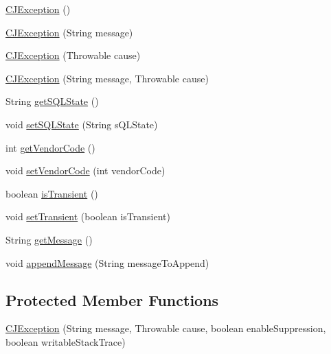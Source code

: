 \begin{DoxyCompactItemize}
\item 
\mbox{\hyperlink{classcom_1_1mysql_1_1cj_1_1exceptions_1_1_c_j_exception_a04cff2e34c2f2ab8915c61a4b58ff2e8}{C\+J\+Exception}} ()
\item 
\mbox{\hyperlink{classcom_1_1mysql_1_1cj_1_1exceptions_1_1_c_j_exception_a126f9d19402c4a2db6e71882f204e933}{C\+J\+Exception}} (String message)
\item 
\mbox{\hyperlink{classcom_1_1mysql_1_1cj_1_1exceptions_1_1_c_j_exception_a755ad709aba5c2a7513ebbfce5da7139}{C\+J\+Exception}} (Throwable cause)
\item 
\mbox{\hyperlink{classcom_1_1mysql_1_1cj_1_1exceptions_1_1_c_j_exception_a976cd10f784169265bdb0828e49c080c}{C\+J\+Exception}} (String message, Throwable cause)
\item 
String \mbox{\hyperlink{classcom_1_1mysql_1_1cj_1_1exceptions_1_1_c_j_exception_a72658f4b1d247e7ff34394c8062de25b}{get\+S\+Q\+L\+State}} ()
\item 
void \mbox{\hyperlink{classcom_1_1mysql_1_1cj_1_1exceptions_1_1_c_j_exception_ae88c79eacca8242bb6901936ecd7466c}{set\+S\+Q\+L\+State}} (String s\+Q\+L\+State)
\item 
int \mbox{\hyperlink{classcom_1_1mysql_1_1cj_1_1exceptions_1_1_c_j_exception_ae07e3fc9408e1198239707007ba53c26}{get\+Vendor\+Code}} ()
\item 
void \mbox{\hyperlink{classcom_1_1mysql_1_1cj_1_1exceptions_1_1_c_j_exception_a6f31bc876ef849fa89123aa7c74985e7}{set\+Vendor\+Code}} (int vendor\+Code)
\item 
boolean \mbox{\hyperlink{classcom_1_1mysql_1_1cj_1_1exceptions_1_1_c_j_exception_a75950d0a5a7aca0c0e3909b5c4a67e3a}{is\+Transient}} ()
\item 
void \mbox{\hyperlink{classcom_1_1mysql_1_1cj_1_1exceptions_1_1_c_j_exception_ab311ea97f0289e8fb07177f78b4283cf}{set\+Transient}} (boolean is\+Transient)
\item 
String \mbox{\hyperlink{classcom_1_1mysql_1_1cj_1_1exceptions_1_1_c_j_exception_a9918a82c000e0061033895fbc12126be}{get\+Message}} ()
\item 
void \mbox{\hyperlink{classcom_1_1mysql_1_1cj_1_1exceptions_1_1_c_j_exception_a7848d822e954b8d5d2e5a5619b45d8b2}{append\+Message}} (String message\+To\+Append)
\end{DoxyCompactItemize}
\subsection*{Protected Member Functions}
\begin{DoxyCompactItemize}
\item 
\mbox{\hyperlink{classcom_1_1mysql_1_1cj_1_1exceptions_1_1_c_j_exception_a8ecb5eccfadefa15219ee2a5db4abc03}{C\+J\+Exception}} (String message, Throwable cause, boolean enable\+Suppression, boolean writable\+Stack\+Trace)
\end{DoxyCompactItemize}
